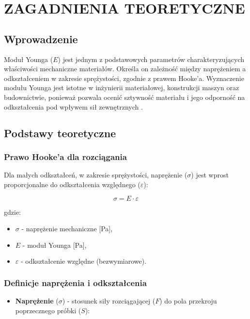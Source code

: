 \documentclass{article}
\begin{document}
\pagebreak


\centering

\section*{ZAGADNIENIA TEORETYCZNE}

{
\subsection*{Wprowadzenie}
Moduł Younga ($E$) jest jednym z podstawowych parametrów charakteryzujących właściwości mechaniczne materiałów. Określa on zależność między naprężeniem a odkształceniem w zakresie sprężystości, zgodnie z prawem Hooke'a. Wyznaczenie modułu Younga jest istotne w inżynierii materiałowej, konstrukcji maszyn oraz budownictwie, ponieważ pozwala ocenić sztywność materiału i jego odporność na odkształcenia pod wpływem sił zewnętrznych \cite{nowicki}.

\subsection*{Podstawy teoretyczne}
\subsubsection*{Prawo Hooke'a dla rozciągania}
Dla małych odkształceń, w zakresie sprężystości, naprężenie ($\sigma$) jest wprost proporcjonalne do odkształcenia względnego ($\varepsilon$):

\begin{equation}
    \sigma = E \cdot \varepsilon
\end{equation}

gdzie:
\begin{itemize}
    \item $\sigma$ - naprężenie mechaniczne [Pa],
    \item $E$ - moduł Younga [Pa],
    \item $\varepsilon$ - odkształcenie względne (bezwymiarowe).
\end{itemize}

\subsubsection*{Definicje naprężenia i odkształcenia}
\begin{itemize}
    \item \textbf{Naprężenie} ($\sigma$) - stosunek siły rozciągającej ($F$) do pola przekroju poprzecznego próbki ($S$):


\end{itemize}}
\end{document}
